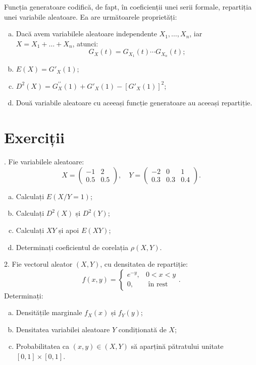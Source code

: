 Funcția generatoare codifică, de fapt, în coeficienții unei serii formale,
repartiția unei variabile aleatoare. Ea are următoarele proprietăți:
\begin{enumerate}[(a)]
\item Dacă avem variabilele aleatoare independente $ X_1, \dots, X_n $,
  iar $ X = X_1 + \dots + X_n $, atunci:
  \[
    G_X(t) = G_{X_1}(t) \cdots G_{X_n}(t);
  \]
\item $ E(X) = G'_X(1) $;
\item $ D^2(X) = G_X^{\prime\prime}(1) + G'_X(1) - [G'_X(1)]^2 $;
\item Două variabile aleatoare cu aceeași funcție generatoare au aceeași repartiție.
\end{enumerate}

\section{Exerciții}

\indent{}. Fie variabilele aleatoare:
\[
  X = \begin{pmatrix}
    -1 & 2 \\
    0.5 & 0.5
  \end{pmatrix}, \quad
  Y = \begin{pmatrix}
    -2 & 0 & 1 \\
    0.3 & 0.3 & 0.4
  \end{pmatrix}.
\]

\begin{enumerate}[(a)]
\item Calculați $ E(X / Y = 1) $;
\item Calculați $ D^2(X) $ și $ D^2(Y) $;
\item Calculați $ XY $ și apoi $ E(XY) $;
\item Determinați coeficientul de corelația $ \rho(X, Y) $.
\end{enumerate}

\vspace{0.3cm}

2. Fie vectorul aleator $ (X, Y) $, cu densitatea de repartiție:
\[
  f(x, y) = \begin{cases}
    e^{-y}, & 0 < x < y \\
    0, & \text{ în rest}
  \end{cases}.
\]
Determinați:
\begin{enumerate}[(a)]
\item Densitățile marginale $ f_X(x) $ și $ f_Y(y) $;
\item Densitatea variabilei aleatoare $ Y $ condiționată de $ X $;
\item Probabilitatea ca $ (x, y) \in (X, Y) $ să aparțină pătratului
  unitate $ [0, 1] \times [0, 1] $.
\end{enumerate}

